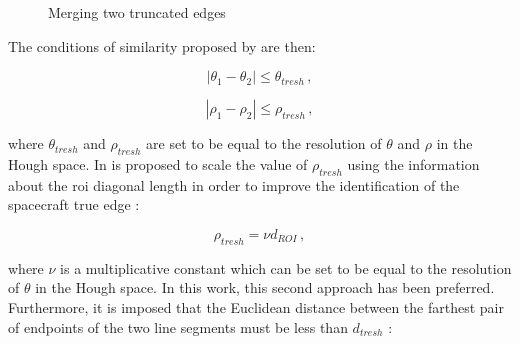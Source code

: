 \begin{figure}[htbp]
  \centering
  \qquad
  \qquad
  \caption{Merging two truncated edges \cite{Sharma2018}}
  \label{fig:mergeEdges}
\end{figure}

The conditions of similarity proposed by \cite{Sharma2018} are then:

\begin{equation}
|\theta_1 - \theta_2| \leqslant	\theta_{tresh} \,,
\end{equation}

\begin{equation}
|\rho_1 - \rho_2| \leqslant	\rho_{tresh} \,,
\end{equation}

where $\theta_{tresh}$ and $\rho_{tresh}$ are set to be equal to the resolution of $\theta$ and $\rho$ in the Hough space. In \cite{fracchio2019} is proposed to scale the value of $\rho_{tresh}$ using the information about the \acrshort{roi} diagonal length in order to improve the identification of the spacecraft true edge :

\begin{equation}
\rho_{tresh} = \nu d_{ROI} \,,
\end{equation}

where $\nu$ is a multiplicative constant which can be set to be equal to the resolution of $\theta$ in the Hough space. In this work, this second approach has been preferred. 
Furthermore, it is imposed that the Euclidean distance between the farthest pair of endpoints of the two line segments must be less than $d_{tresh}$ :

